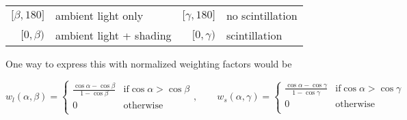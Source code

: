 \documentclass[11pt]{article}
\begin{document}
\begin{center}
\begin{tabular}{rlrl}
$\lbrack \beta, 180 \rbrack$ & ambient light only & $\lbrack \gamma, 180 \rbrack$ & no scintillation \\
$\lbrack 0, \beta )$ & ambient light + shading & $\lbrack 0, \gamma )$ & scintillation \\
\end{tabular}
\end{center}

One way to express this with normalized weighting factors would be

\begin{displaymath}
w_l(\alpha,\beta) = \left\lbrace\begin{array}{rl}
\frac{\cos\alpha - \cos\beta}{1 - \cos\beta} & \mbox{if} \cos\alpha > \cos\beta\\
0 & \mbox{otherwise}\\
\end{array} \right. , \qquad
w_s(\alpha,\gamma) = \left\lbrace\begin{array}{rl}
\frac{\cos\alpha - \cos\gamma}{1 - \cos\gamma} & \mbox{if} \cos\alpha > \cos\gamma\\
0 & \mbox{otherwise}\\
\end{array} \right.
\end{displaymath}
\end{document}
